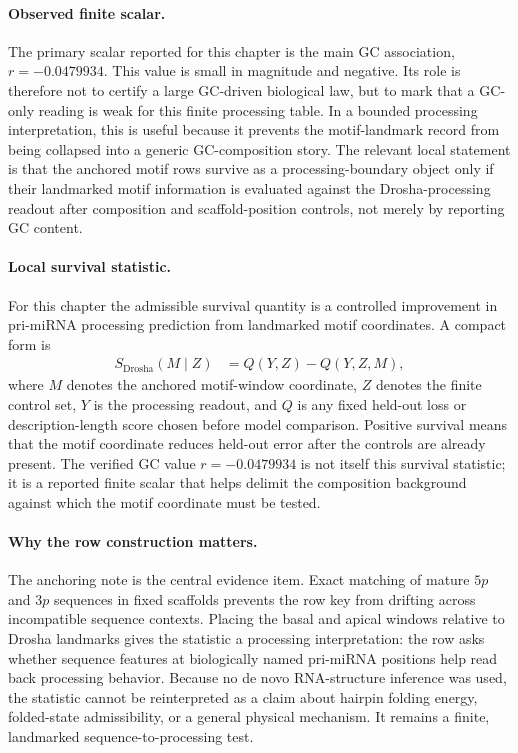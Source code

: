 \paragraph{Observed finite scalar.}
The primary scalar reported for this chapter is the main GC association, $r=-0.0479934$. This value is small in magnitude and negative. Its role is therefore not to certify a large GC-driven biological law, but to mark that a GC-only reading is weak for this finite processing table. In a bounded processing interpretation, this is useful because it prevents the motif-landmark record from being collapsed into a generic GC-composition story. The relevant local statement is that the anchored motif rows survive as a processing-boundary object only if their landmarked motif information is evaluated against the Drosha-processing readout after composition and scaffold-position controls, not merely by reporting GC content.

\paragraph{Local survival statistic.}
For this chapter the admissible survival quantity is a controlled improvement in pri-miRNA processing prediction from landmarked motif coordinates. A compact form is
$$
\begin{aligned}
  S_{\mathrm{Drosha}}(M\mid Z)
    &= Q(Y, Z) - Q(Y, Z, M),
\end{aligned}
$$
where $M$ denotes the anchored motif-window coordinate, $Z$ denotes the finite control set, $Y$ is the processing readout, and $Q$ is any fixed held-out loss or description-length score chosen before model comparison. Positive survival means that the motif coordinate reduces held-out error after the controls are already present. The verified GC value $r=-0.0479934$ is not itself this survival statistic; it is a reported finite scalar that helps delimit the composition background against which the motif coordinate must be tested.

\paragraph{Why the row construction matters.}
The anchoring note is the central evidence item. Exact matching of mature $5p$ and $3p$ sequences in fixed scaffolds prevents the row key from drifting across incompatible sequence contexts. Placing the basal and apical windows relative to Drosha landmarks gives the statistic a processing interpretation: the row asks whether sequence features at biologically named pri-miRNA positions help read back processing behavior. Because no de novo RNA-structure inference was used, the statistic cannot be reinterpreted as a claim about hairpin folding energy, folded-state admissibility, or a general physical mechanism. It remains a finite, landmarked sequence-to-processing test.

